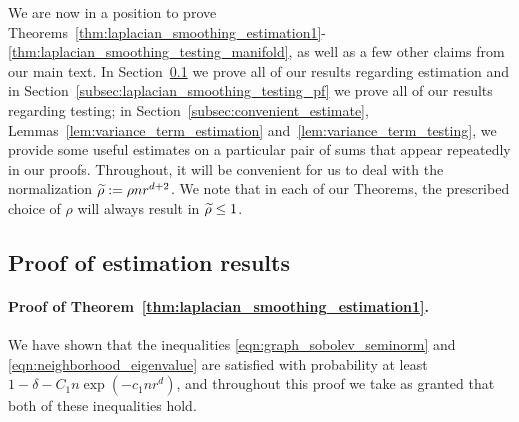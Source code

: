 We are now in a position to prove Theorems~\ref{thm:laplacian_smoothing_estimation1}-\ref{thm:laplacian_smoothing_testing_manifold}, as well as a few other claims from our main text. In Section~\ref{subsec:laplacian_smoothing_estimation1_pf} we prove all of our results regarding estimation and in Section~\ref{subsec:laplacian_smoothing_testing_pf} we prove all of our results regarding testing; in Section~\ref{subsec:convenient_estimate}, Lemmas~\ref{lem:variance_term_estimation} and~\ref{lem:variance_term_testing}, we provide some useful estimates on a particular pair of sums that appear repeatedly in our proofs. Throughout, it will be convenient for us to deal with the normalization $\widetilde{\rho} := \rho nr^{d + 2}$. We note that in each of our Theorems, the prescribed choice of $\rho$ will always result in $\widetilde{\rho} \leq 1$. 

\subsection{Proof of estimation results}
\label{subsec:laplacian_smoothing_estimation1_pf}

\paragraph{Proof of Theorem~\ref{thm:laplacian_smoothing_estimation1}.}
We have shown that the inequalities \eqref{eqn:graph_sobolev_seminorm} and \eqref{eqn:neighborhood_eigenvalue} are satisfied with probability at least $1 - \delta - C_1n\exp(-c_1nr^d)$, and throughout this proof we take as granted that both of these inequalities hold.

